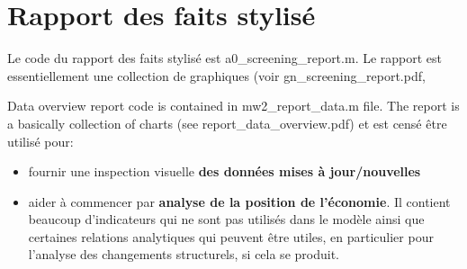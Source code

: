 \section{Rapport des faits stylisé}
	Le code du rapport des faits stylisé est {\color{magenta}a0\_screening\_report.m}. Le rapport est essentiellement une collection de graphiques (voir {\color{magenta}gn\_screening\_report.pdf}, 
	   
    Data overview report code is contained in {\color{magenta}mw2\_report\_data.m} file. The report is a basically collection of charts (see {\color{magenta}report\_data\_overview.pdf})
     et est censé être utilisé pour:
    \begin{itemize}
        \item fournir une inspection visuelle {\bf des données mises à jour/nouvelles}
        \item aider à commencer par {\bf analyse de la position de l'économie}. Il contient beaucoup d'indicateurs qui ne sont pas utilisés dans le modèle ainsi que certaines relations analytiques qui peuvent être utiles, en particulier pour l'analyse des changements structurels, si cela se produit.            
        \end{itemize}

